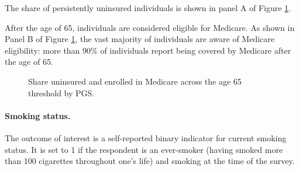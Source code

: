 \documentclass[11pt]{article}
\begin{document}
The share of persistently uninsured individuals is shown in panel A of Figure \ref{fig:Medicare_unins}.

After the age of 65, individuals are considered eligible for Medicare.
As shown in Panel B of Figure \ref{fig:Medicare_unins}, the vast majority of individuals are aware of Medicare eligibility: more than 90\% of individuals report being covered by Medicare after the age of 65.


\begin{figure}[ht]
	\begin{center}
		\caption{Share uninsured and enrolled in Medicare across the age 65 threshold by PGS.
	\label{fig:Medicare_unins}}
	\vspace{-5ex}
	\end{center}
\end{figure}

\paragraph{Smoking status.} The outcome of interest is a self-reported binary indicator for current smoking status.
It is set to 1 if the respondent is an ever-smoker (having smoked more than 100 cigarettes throughout one's life) and smoking at the time of the survey.
\end{document}
